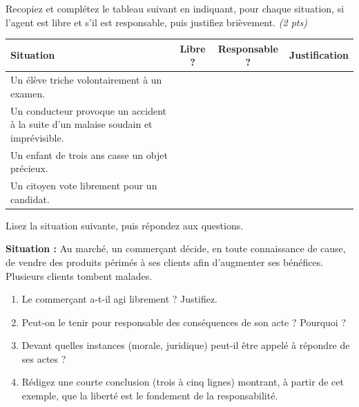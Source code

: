 \documentclass[11pt]{article}
\begin{document}
\begin{exercice}
Recopiez et complétez le tableau suivant en indiquant, pour chaque situation, si l'agent est libre et s'il est responsable, puis justifiez brièvement. \textit{(2 pts)}
\begin{center}
\begin{tabular}{|p{5.5cm}|c|c|p{4cm}|}
\hline
\textbf{Situation} & \textbf{Libre ?} & \textbf{Responsable ?} & \textbf{Justification} \\
\hline
Un élève triche volontairement à un examen. & & & \\
\hline
Un conducteur provoque un accident à la suite d'un malaise soudain et imprévisible. & & & \\
\hline
Un enfant de trois ans casse un objet précieux. & & & \\
\hline
Un citoyen vote librement pour un candidat. & & & \\
\hline
\end{tabular}
\end{center}
\end{exercice}

\begin{exercice}
Lisez la situation suivante, puis répondez aux questions.

\textbf{Situation :} Au marché, un commerçant décide, en toute connaissance de cause, de vendre des produits périmés à ses clients afin d'augmenter ses bénéfices. Plusieurs clients tombent malades.
\begin{enumerate}
\item Le commerçant a-t-il agi librement ? Justifiez.
\item Peut-on le tenir pour responsable des conséquences de son acte ? Pourquoi ?
\item Devant quelles instances (morale, juridique) peut-il être appelé à répondre de ses actes ?
\item Rédigez une courte conclusion (trois à cinq lignes) montrant, à partir de cet exemple, que la liberté est le fondement de la responsabilité.
\end{enumerate}
\end{exercice}
\end{document}
